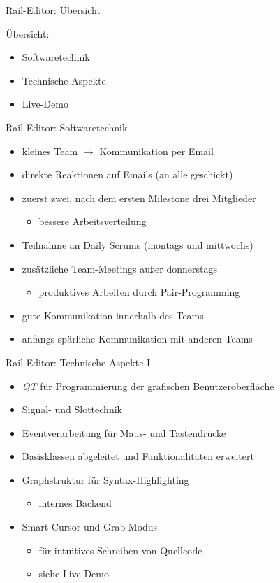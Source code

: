\begin{frame}{Rail-Editor: Übersicht}

	Übersicht:
	\begin{itemize}
		\item Softwaretechnik
		\item Technische Aspekte
		\item Live-Demo
	\end{itemize}

\end{frame}

\pagebreak

\begin{frame}{Rail-Editor: Softwaretechnik}
	\begin{itemize}
		\item kleines Team $\rightarrow$ Kommunikation per Email
		\pause
		\item direkte Reaktionen auf Emails (an alle geschickt)
		\pause
		\item zuerst zwei, nach dem ersten Milestone drei Mitglieder
		\begin{itemize}
			\item bessere Arbeitsverteilung
		\end{itemize}
		\pause
		\item Teilnahme an Daily Scrums (montags und mittwochs)
		\pause
		\item zusätzliche Team-Meetings außer donnerstags
		\begin{itemize}
			\item produktives Arbeiten durch Pair-Programming
		\end{itemize}
		\pause
		\item gute Kommunikation innerhalb des Teams
		\pause
		\item anfangs spärliche Kommunikation mit anderen Teams
	\end{itemize}
\end{frame}

\begin{frame}{Rail-Editor: Technische Aspekte I}
	\begin{itemize}
		\item \textit{QT} für Programmierung der grafischen Benutzeroberfläche
		\pause
		\item Signal- und Slottechnik
		\pause
		\item Eventverarbeitung für Maus- und Tastendrücke
		\pause
		\item Basisklassen abgeleitet und Funktionalitäten erweitert
		\pause
		\item Graphstruktur für Syntax-Highlighting
		\begin{itemize}
			\item internes Backend
		\end{itemize}
		\pause
		\item Smart-Cursor und Grab-Modus
		\begin{itemize}
			\item für intuitives Schreiben von Quellcode
			\item siehe Live-Demo
		\end{itemize}
	\end{itemize}
\end{frame}


